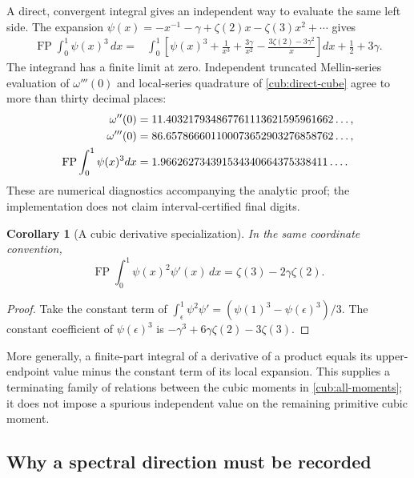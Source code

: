 \documentclass[11pt,a4paper]{article}
\newtheorem{corollary}[theorem]{Corollary}
\theoremstyle{definition}
\theoremstyle{remark}
\DeclareMathOperator*{\FP}{FP}
\numberwithin{equation}{section}
\begin{document}
A direct, convergent integral gives an independent way to evaluate
the same left side.  The expansion
$\psi(x)=-x^{-1}-\gamma+\zeta(2)x-\zeta(3)x^2+\cdots$ gives
\begin{align}
 \FP\int_0^1\psi(x)^3\,dx
 ={}&\int_0^1\left[\psi(x)^3+\frac1{x^3}
       +\frac{3\gamma}{x^2}
       -\frac{3\zeta(2)-3\gamma^2}{x}\right]dx
       +\frac12+3\gamma.
 \label{cub:direct-cube}
\end{align}
The integrand has a finite limit at zero.  Independent truncated
Mellin-series evaluation of $\omega'''(0)$ and local-series quadrature
of \eqref{cub:direct-cube} agree to more than thirty decimal places:
\begin{align}
 \omega''(0)&=11.403217934867761113621595961662\ldots,\notag\\
 \omega'''(0)&=86.657866601100073652903276858762\ldots,\notag\\
 \FP\int_0^1\psi(x)^3dx
   &=1.966262734391534340664375338411\ldots.
 \label{cub:numerics}
\end{align}
These are numerical diagnostics accompanying the analytic proof;
the implementation does not claim interval-certified final digits.

\begin{corollary}[A cubic derivative specialization]
\label{cub:cubic-derivative}
In the same coordinate convention,
\begin{equation}\label{cub:psi-square-prime}
 \FP\int_0^1\psi(x)^2\psi'(x)\,dx
             =\zeta(3)-2\gamma\zeta(2).
\end{equation}
\end{corollary}
\begin{proof}
Take the constant term of
$\int_\epsilon^1\psi^2\psi'=(\psi(1)^3-\psi(\epsilon)^3)/3$.
The constant coefficient of $\psi(\epsilon)^3$ is
$-\gamma^3+6\gamma\zeta(2)-3\zeta(3)$.
\end{proof}

More generally, a finite-part integral of a derivative of a product
equals its upper-endpoint value minus the constant term of its local
expansion.  This supplies a terminating family of relations between
the cubic moments in \eqref{cub:all-moments}; it does not impose a
spurious independent value on the remaining primitive cubic moment.

\subsection{Why a spectral direction must be recorded}
\end{document}
